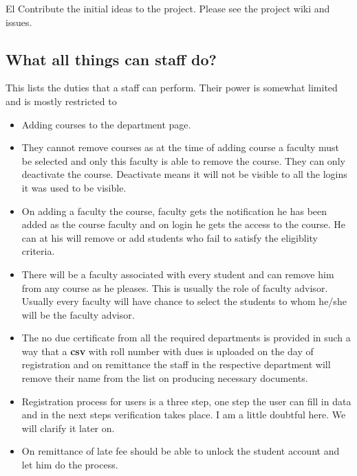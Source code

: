 \documentclass[a4paper,twoside]{article}
\begin{document}
El
Contribute the initial ideas to the project.
Please see the project wiki and issues.

\subsection{What all things can staff do?}
This lists the duties that a staff can perform. Their power is somewhat limited and is mostly restricted to 
\begin{itemize}
\item Adding courses to the department page. 
\item They cannot remove courses as at the time of adding course a faculty must be selected and only this faculty is able to remove the course. They can only deactivate the course. Deactivate means it will not be visible to all the logins it was used to be visible.
\item On adding a faculty the course, faculty gets the notification he has been added as the course faculty and on login he gets the access to the course. He can at his will remove or add students who fail to satisfy the eligiblity criteria. 
\item There will be a faculty associated with every student and can remove him from any course as he pleases. This is usually the role of faculty advisor. Usually every faculty will have chance to select the students  to whom he/she will be the faculty advisor. 
\item The no due certificate from all the required departments is provided in such a way that a \textbf{csv} with roll number with dues is uploaded on the day of registration and on remittance the staff in the respective department will remove their name from the list on producing necessary documents.
\item Registration process for users is a three step, one step the user can fill in data and in the next steps verification takes place. I am a little doubtful here. We will clarify it later on.
\item On remittance of late fee should be able to unlock the student account and let him do the process. 
\end{itemize}
\end{document}
